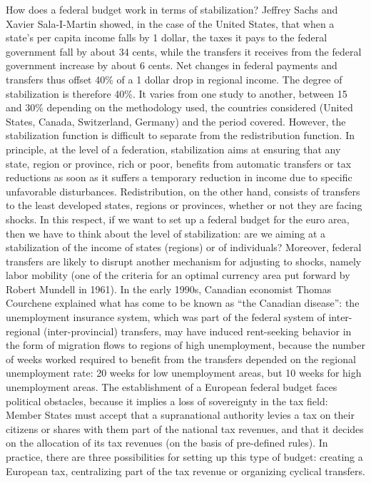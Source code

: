 \documentclass[12pt]{article}
\begin{document}
How does a federal budget work in terms of stabilization? Jeffrey Sachs and Xavier Sala-I-Martin showed, in the case of the United States, that when a state's per capita income falls by 1 dollar, the taxes it pays to the federal government fall by about 34 cents, while the transfers it receives from the federal government increase by about 6 cents. Net changes in federal payments and transfers thus offset 40\% of a 1 dollar drop in regional income. The degree of stabilization is therefore 40\%.  It varies from one study to another, between 15 and 30\% depending on the methodology used, the countries considered (United States, Canada, Switzerland, Germany) and the period covered. However, the stabilization function is difficult to separate from the redistribution function. In principle, at the level of a federation, stabilization aims at ensuring that any state, region or province, rich or poor, benefits from automatic transfers or tax reductions as soon as it suffers a temporary reduction in income due to specific unfavorable disturbances. Redistribution, on the other hand, consists of transfers to the least developed states, regions or provinces, whether or not they are facing shocks. In this respect, if we want to set up a federal budget for the euro area, then we have to think about the level of stabilization: are we aiming at a stabilization of the income of states (regions) or of individuals? Moreover, federal transfers are likely to disrupt another mechanism for adjusting to shocks, namely labor mobility (one of the criteria for an optimal currency area put forward by Robert Mundell in 1961). In the early 1990s, Canadian economist Thomas Courchene explained what has come to be known as “the Canadian disease”: the unemployment insurance system, which was part of the federal system of inter-regional (inter-provincial) transfers, may have induced rent-seeking behavior in the form of migration flows to regions of high unemployment, because the number of weeks worked required to benefit from the transfers depended on the regional unemployment rate: 20 weeks for low unemployment areas, but 10 weeks for high unemployment areas.
The establishment of a European federal budget faces political obstacles, because it implies a loss of sovereignty in the tax field: Member States must accept that a supranational authority levies a tax on their citizens or shares with them part of the national tax revenues, and that it decides on the allocation of its tax revenues (on the basis of pre-defined rules). In practice, there are three possibilities for setting up this type of budget: creating a European tax, centralizing part of the tax revenue or organizing cyclical transfers.
\end{document}

